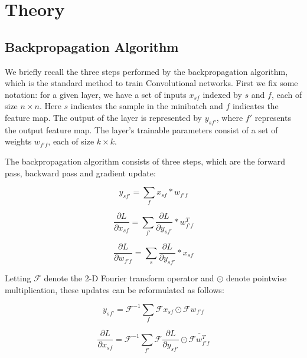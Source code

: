 \documentclass{article}
\begin{document}
\section{Theory}

\subsection{Backpropagation Algorithm}

We briefly recall the three steps performed by the backpropagation algorithm, which is the standard method to train Convolutional networks.
First we fix some notation: for a given layer, we have a set of inputs $x_{sf}$ indexed by $s$ and $f$, each of size $n \times n$.
Here $s$ indicates the sample in the minibatch and $f$ indicates the feature map. 
The output of the layer is represented by $y_{sf'}$, where $f'$ represents the output feature map. 
The layer's trainable parameters consist of a set of weights $w_{f'f}$, each of size $k \times k$.

The backpropagation algorithm consists of three steps, which are the forward pass, backward pass and gradient update:

\begin{equation}
y_{sf'} = \sum_f x_{sf} \ast w_{f'f} 
\end{equation}

\begin{equation}
 \frac{\partial L}{\partial x_{sf}} = \sum_{f'} \frac{\partial L}{\partial y_{sf'}} \ast w_{f'f}^T
 \end{equation}

\begin{equation}
 \frac{\partial L}{\partial w_{f'f}} = \sum_{s} \frac{\partial L}{\partial y_{sf'}} \ast x_{sf}
\end{equation}

Letting $\mathcal{F}$ denote the 2-D Fourier transform operator and $\odot$ denote pointwise multiplication, these updates can be reformulated as follows:

\begin{equation}
y_{sf'} = \mathcal{F}^{-1}\sum_f \mathcal{F}x_{sf} \odot \mathcal{F}w_{f'f}
\end{equation}

\begin{equation}
 \frac{\partial L}{\partial x_{sf}} = \mathcal{F}^{-1}\sum_{f'} \mathcal{F}\frac{\partial L}{\partial y_{sf'}} \odot \overline{\mathcal{F}w_{f'f}^T}
 \end{equation}
\end{document}
